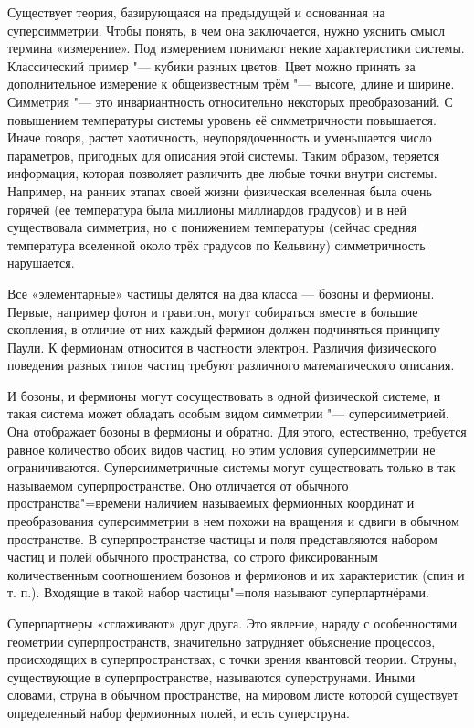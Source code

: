 Существует теория, базирующаяся на предыдущей и основанная на суперсимметрии.
Чтобы понять, в чем она заключается, нужно уяснить смысл термина «измерение».
Под измерением понимают некие характеристики системы.
Классический пример "--- кубики разных цветов.
Цвет можно принять за дополнительное измерение к общеизвестным трём "--- высоте, длине и ширине.
Симметрия "--- это инвариантность относительно некоторых преобразований.
С повышением температуры системы уровень её симметричности повышается.
Иначе говоря, растет хаотичность, неупорядоченность и уменьшается число параметров, пригодных для описания этой системы.
Таким образом, теряется информация, которая позволяет различить две любые точки внутри системы.
Например, на ранних этапах своей жизни физическая вселенная была очень горячей (ее температура была миллионы миллиардов градусов) и в ней существовала симметрия,
но с понижением температуры (сейчас средняя температура вселенной около трёх градусов по Кельвину) симметричность нарушается. 

Все «элементарные» частицы делятся на два класса — бозоны и фермионы.
Первые, например фотон и гравитон, могут собираться вместе в большие скопления,
в отличие от них каждый фермион должен подчиняться принципу Паули.
К фермионам относится в частности электрон.
Различия физического поведения разных типов частиц требуют различного математического описания.

И бозоны, и фермионы могут сосуществовать в одной физической системе,
и такая система может обладать особым видом симметрии "--- суперсимметрией.
Она отображает бозоны в фермионы и обратно.
Для этого, естественно, требуется равное количество обоих видов частиц,
но этим условия суперсимметрии не ограничиваются.
Суперсимметричные системы могут существовать только в так называемом суперпространстве.
Оно отличается от обычного пространства"=времени наличием называемых фермионных координат
и преобразования суперсимметрии в нем похожи на вращения и сдвиги в обычном пространстве.
В суперпространстве частицы и поля представляются набором частиц и полей обычного пространства,
со строго фиксированным количественным соотношением бозонов и фермионов и их характеристик (спин и т. п.).
Входящие в такой набор частицы"=поля называют суперпартнёрами.

Суперпартнеры «сглаживают» друг друга.
Это явление, наряду с особенностями геометрии суперпространств,
значительно затрудняет объяснение процессов,
происходящих в суперпространствах,
с точки зрения квантовой теории.
Струны, существующие в суперпространстве,
называются суперструнами.
Иными словами, струна в обычном пространстве,
на мировом листе которой существует определенный
набор фермионных полей, и есть суперструна. 

